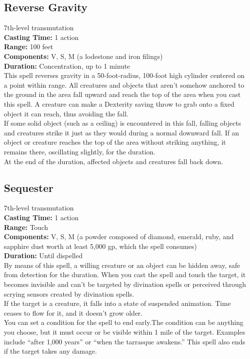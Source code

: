 \documentclass[11pt, A4paper, english]{article}
\begin{document}
		\subsection{Reverse Gravity}
7th-level transmutation \\
\textbf{Casting Time:} 1 action \\
\textbf{Range:} 100 feet \\
\textbf{Components:} V, S, M (a lodestone and iron filings) \\
\textbf{Duration:} Concentration, up to 1 minute \\
This spell reverses gravity in a 50-foot-radius, 100-foot high cylinder centered on a point within range. All creatures and objects that aren’t somehow anchored to the ground in the area fall upward and reach the top of the area when you cast this spell. A creature can make a Dexterity saving throw to grab onto a fixed object it can reach, thus avoiding the fall. \\
If some solid object (such as a ceiling) is encountered in this fall, falling objects and creatures strike it just as they would during a normal downward fall. If an object or creature reaches the top of the area without striking anything, it remains there, oscillating slightly, for the duration. \\
At the end of the duration, affected objects and creatures fall back down.

		\subsection{Sequester}
7th-level transmutation \\
\textbf{Casting Time:} 1 action \\
\textbf{Range:} Touch \\
\textbf{Components:} V, S, M (a powder composed of diamond, emerald, ruby, and sapphire dust worth at least 5,000 gp, which the spell consumes) \\
\textbf{Duration:} Until dispelled \\
By means of this spell, a willing creature or an object can be hidden away, safe from detection for the duration. When you cast the spell and touch the target, it becomes invisible and can’t be targeted by divination spells or perceived through scrying sensors created by divination spells. \\
If the target is a creature, it falls into a state of suspended animation. Time ceases to flow for it, and it doesn’t grow older. \\
You can set a condition for the spell to end early.The condition can be anything you choose, but it must occur or be visible within 1 mile of the target. Examples include “after 1,000 years” or “when the tarrasque awakens.” This spell also ends if the target takes any damage.
\end{document}
